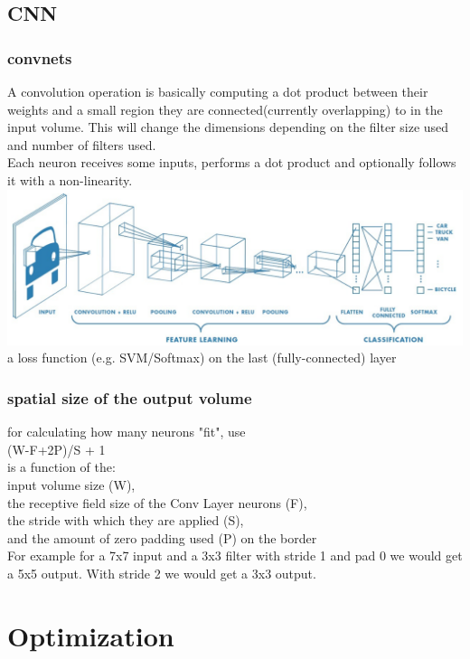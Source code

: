 \documentclass{beamer}
\begin{document}
\subsection{CNN}

\begin{frame}[allowframebreaks]\frametitle{convnets}
	A convolution operation is basically computing a dot product between their weights and a small region they are connected(currently overlapping) to in the input volume. This will change the dimensions depending on the filter size used and number of filters used.\\
	Each neuron receives some inputs, performs a dot product and optionally follows it with a non-linearity.\\
	\includegraphics[scale=0.4]{CNN/structure}\\
	a loss function (e.g. SVM/Softmax) on the last (fully-connected) layer\\
\end{frame}



\begin{frame}\frametitle{spatial size of the output volume}
	for calculating how many neurons "fit", use\\
	(W-F+2P)/S + 1\\
	is a function of the:\\
	input volume size (W),\\
	the receptive field size of the Conv Layer neurons (F), \\
	the stride with which they are applied (S), \\
	and the amount of zero padding used (P) on the border\\
	For example for a 7x7 input and a 3x3 filter with stride 1 and pad 0 we would get a 5x5 output. With stride 2 we would get a 3x3 output.

\end{frame}


\section{Optimization}
\end{document}
